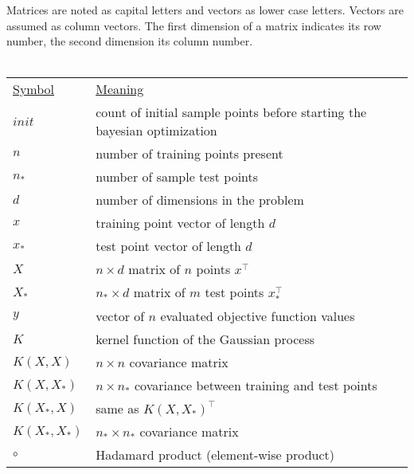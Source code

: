 Matrices are noted as capital letters and vectors as lower case letters. Vectors are assumed as column vectors. The first dimension of a matrix indicates its row number, the second dimension its column number.\\
\\
\begin{tabular}{l l}
    \underline{Symbol} & \underline{Meaning}\\

    $init$ & count of initial sample points before starting the bayesian optimization\\
    $n$ & number of training points present\\
    $n_*$ & number of sample test points\\
    $d$ & number of dimensions in the problem\\
    $x$ & training point vector of length $d$\\
    $x_*$ & test point vector of length $d$\\
    $X$ & $n \times d$ matrix of $n$ points $x^{\top}$\\
    $X_*$ & $n_* \times d$ matrix of $m$ test points $x^{\top}_*$\\
    $y$ & vector of $n$ evaluated objective function values\\
    $K$ & kernel function of the Gaussian process\\
    $K(X,X)$ & $n \times n$ covariance matrix\\
    $K(X,X_*)$ & $n \times n_*$ covariance between training and test points\\
    $K(X_*,X)$ & same as $K(X,X_*)^{\top}$\\
    $K(X_*,X_*)$ & $n_* \times n_*$ covariance matrix\\
    $\circ$ & Hadamard product (element-wise product)\\
\end{tabular}
